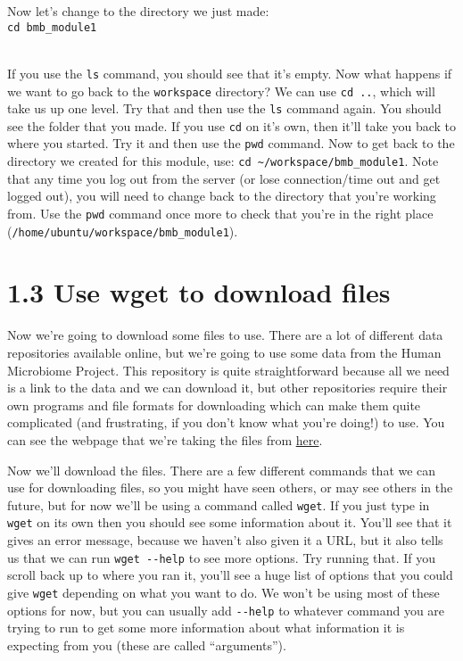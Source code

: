 \documentclass[
]{book}
\begin{document}
Now let's change to the directory we just made:\\
\texttt{cd\ bmb\_module1}\strut \\
If you use the \texttt{ls} command, you should see that it's empty. Now what happens if we want to go back to the \texttt{workspace} directory? We can use \texttt{cd\ ..}, which will take us up one level. Try that and then use the \texttt{ls} command again. You should see the folder that you made. If you use \texttt{cd} on it's own, then it'll take you back to where you started. Try it and then use the \texttt{pwd} command. Now to get back to the directory we created for this module, use: \texttt{cd\ \textasciitilde{}/workspace/bmb\_module1}.
Note that any time you log out from the server (or lose connection/time out and get logged out), you will need to change back to the directory that you're working from. Use the \texttt{pwd} command once more to check that you're in the right place (\texttt{/home/ubuntu/workspace/bmb\_module1}).

\section{1.3 Use wget to download files}\label{use-wget-to-download-files}

Now we're going to download some files to use. There are a lot of different data repositories available online, but we're going to use some data from the Human Microbiome Project. This repository is quite straightforward because all we need is a link to the data and we can download it, but other repositories require their own programs and file formats for downloading which can make them quite complicated (and frustrating, if you don't know what you're doing!) to use. You can see the webpage that we're taking the files from \href{https://www.ibdmdb.org/downloads/html/rawfiles_16s_2018-01-08.html}{here}.

Now we'll download the files. There are a few different commands that we can use for downloading files, so you might have seen others, or may see others in the future, but for now we'll be using a command called \texttt{wget}. If you just type in \texttt{wget} on its own then you should see some information about it. You'll see that it gives an error message, because we haven't also given it a URL, but it also tells us that we can run \texttt{wget\ -\/-help} to see more options. Try running that. If you scroll back up to where you ran it, you'll see a huge list of options that you could give \texttt{wget} depending on what you want to do. We won't be using most of these options for now, but you can usually add \texttt{-\/-help} to whatever command you are trying to run to get some more information about what information it is expecting from you (these are called ``arguments'').
\end{document}
